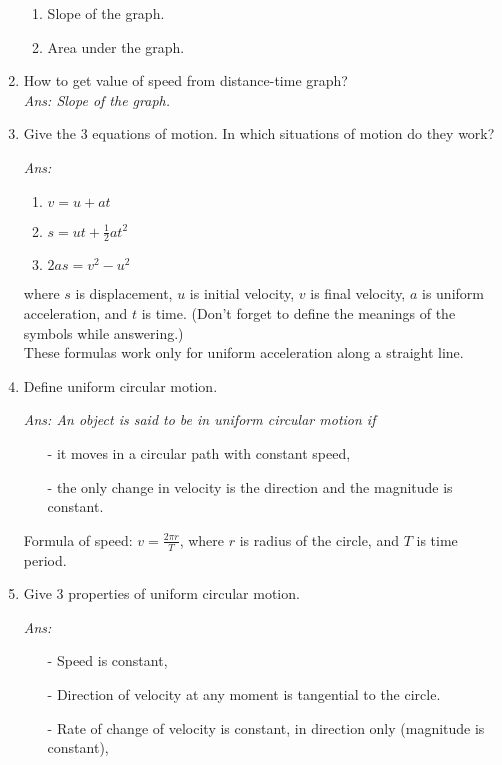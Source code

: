 \documentclass[12pt]{article}
\begin{document}
\begin{enumerate}
{\begin{enumerate}
				\item Slope of the graph.
				\item Area under the graph.
			\end{enumerate}
		}
	\item How to get value of speed from distance-time graph? \\
		{\itshape Ans: Slope of the graph.}
	\item Give the 3 equations of motion. In which situations of motion do they work? \\ 
		{\itshape Ans: 
			\begin{enumerate}
				\item $ v = u + at $
				\item $ s = ut + \frac{1}{2}at^2 $
				\item $ 2as = v^2 - u^2 $
			\end{enumerate}
		where $ s $ is displacement, $ u $ is initial velocity, $ v $ is final velocity, $ a $ is uniform acceleration, and $ t $ is time. (Don't forget to define the meanings of the symbols while answering.) \\
		These formulas work only for uniform acceleration along a straight line.

		}
	\item Define uniform circular motion. \\
		{\itshape Ans: An object is said to be in uniform circular motion if 
			\begin{itemize}
				\item[-] it moves in a circular path with constant speed,
				\item[-] the only change in velocity is the direction and the magnitude is constant.
			\end{itemize}
			Formula of speed: $ v = \frac{2 \pi r}{T} $, where $ r $ is radius of the circle, and $ T $ is time period.
	}
	\item Give 3 properties of uniform circular motion. \\
		{\itshape Ans:
			\begin{itemize}
				\item[-] Speed is constant,
				\item[-] Direction of velocity at any moment is tangential to the circle.
				\item[-] Rate of change of velocity is constant, in direction only (magnitude is constant),
			\end{itemize}
		}
\end{enumerate}
\end{document}
